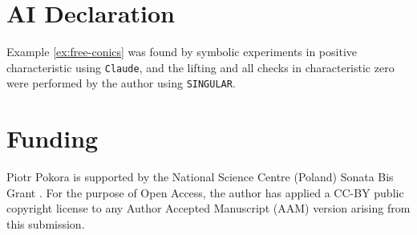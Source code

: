 \documentclass[11pt]{amsart}
\theoremstyle{definition}
\numberwithin{equation}{section}
\begin{document}
\section*{AI Declaration}
Example \ref{ex:free-conics} was found by symbolic experiments in positive characteristic using \texttt{Claude}, and the lifting and all checks in characteristic zero were performed by the author using \texttt{SINGULAR}.

\section*{Funding}
Piotr Pokora is supported by the National Science Centre (Poland) Sonata Bis Grant \textbf{}. For the purpose of Open Access, the author has applied a CC-BY public copyright license to any Author Accepted Manuscript (AAM) version arising from this submission.
\end{document}
